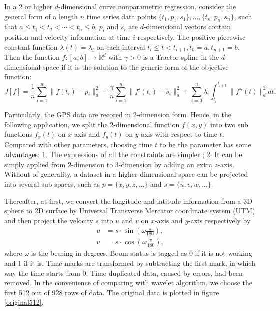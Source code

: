 In a 2 or higher $d$-dimensional curve nonparametric regression, consider the general form of a length $n$ time series data points $\{t_1,p_1,s_1\}, \ldots, \{t_n,p_n,s_n\}$, such that $a \leq t_1<t_2< \cdots < t_n \leq b$, $p_i$ and $s_i$ are $d$-dimensional vectors contain position and velocity information at time $i$ respectively. The positive piecewise constant function $\lambda(t) = \lambda_i$ on each interval $t_i \leq t<t_{i+1}, t_0=a, t_{n+1}=b$.  Then the function $f:[a,b]\rightarrow \mathbb{R}^d$ with $\gamma>0$ is a Tractor spline in the $d$-dimensional space if it is the solution to the generic form of the objective function: 
\begin{equation}\label{tractorsplineObjective2D}
J[f]= \frac{1}{n} \sum_{i=1}^{n} \lVert f(t_i)-p_i\rVert_d^2 + \frac{\gamma}{n} \sum_{i=1}^{n} \lVert f'(t_i)-s_i \rVert_d^2 +\sum_{i=0}^{n} \lambda_i\int_{t_i}^{t_{i+1}} \lVert f''(t)\rVert_d^2 dt. 
\end{equation}


Particularly, the GPS data are recored in 2-dimension form. Hence, in the following application, we split the 2-dimensional function $f(x,y)$ into two sub functions $f_x(t)$ on $x$-axis and $f_y(t)$ on $y$-axis with respect to time $t$. Compared with other parameters, choosing time $t$ to be the parameter has some advantages: 1. The expressions of all the constraints are simpler \cite{zhang2013cubic}; 2. It can be simply applied from 2-dimension to 3-dimension by adding an extra $z$-axis. Without of generality, a dataset in a higher dimensional space can be projected into several sub-spaces, such as $p=\{x,y,z,\ldots \}$ and $s=\{u,v,w,\ldots \}$. 


Thereafter, at first, we convert the longitude and latitude information from a 3D sphere to 2D surface by Universal Transverse Mercator coordinate system (UTM) and then project the velocity $s$ into $u$ and $v$ on $x$-axis and $y$-axis respectively by 
\begin{align}
u &=s\cdot \sin (\omega\frac{\pi}{180}),\\
v &= s\cdot \cos (\omega\frac{\pi}{180}),
\end{align}
where $\omega$ is the bearing in degrees. Boom status is tagged as 0 if it is not working and 1 if it is. Time marks are transformed by subtracting the first mark, in which way the time starts from 0. Time duplicated data, caused by errors, had been removed. In the convenience of comparing with wavelet algorithm, we choose the first 512 out of 928 rows of data. The original data is plotted in figure \ref{original512}.

